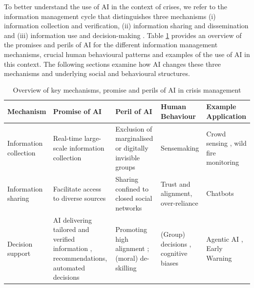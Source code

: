 \documentclass[pdflatex,sn-apa]{sn-jnl}%
\begin{document}
To better understand the use of AI in the context of crises, we refer to the information management cycle that distinguishes three mechanisms (i) information collection and verification, (ii) information sharing and dissemination and (iii) information use and decision-making \citep{van2015On}. Table \ref{tab:AIcrisis-overview} provides an overview of the promises and perils of AI for the different information management mechanisms, crucial human behavioural patterns and examples of the use of AI in this context. The following sections examine how AI changes these three mechanisms and underlying social and behavioural structures.

\begin{table}
    \small
    \centering
    \begin{tabular}{p{} | p{} p{}p{} p{}}
        \hline
        \textbf{Mechanism} & \textbf{Promise of AI} &\textbf{ Peril of AI} & \textbf{Human Behaviour} & \textbf{Example Application}\\ \hline
        Information collection & Real-time large-scale information collection \citep{narmatha2025disaster} & Exclusion of marginalised or digitally invisible groups \citep{coleman2024weaving} & Sensemaking \citep{klein2010rapid} & Crowd sensing \citep{mai2025evaluating}, wild fire monitoring \citep{roy2024multi}\\ \hline
        Information sharing & Facilitate access to diverse sources \citep{jeon2024hearhere} & Sharing confined to closed social networks & Trust and alignment, over-reliance \citep{manzini2024should} & Chatbots \citep{urbanelli2024ermes}\\ \hline
        Decision support &  AI delivering tailored and verified information \citep{zhao2025tailoring}, recommendations, automated decisions & Promoting high alignment \citep{manzini2024should}; (moral) de-skilling \citep{vallor2015moral} & (Group) decisions \citep{comes2024ai}, cognitive biases \citep{paulus2022influence} & Agentic AI \citep{acharya2025agentic}, Early Warning \citep{reichstein2025early}\\ \hline
    \end{tabular}
    \caption{Overview of key mechanisms, promise and perils of AI in crisis management}
    \label{tab:AIcrisis-overview}
\end{table}
\end{document}

